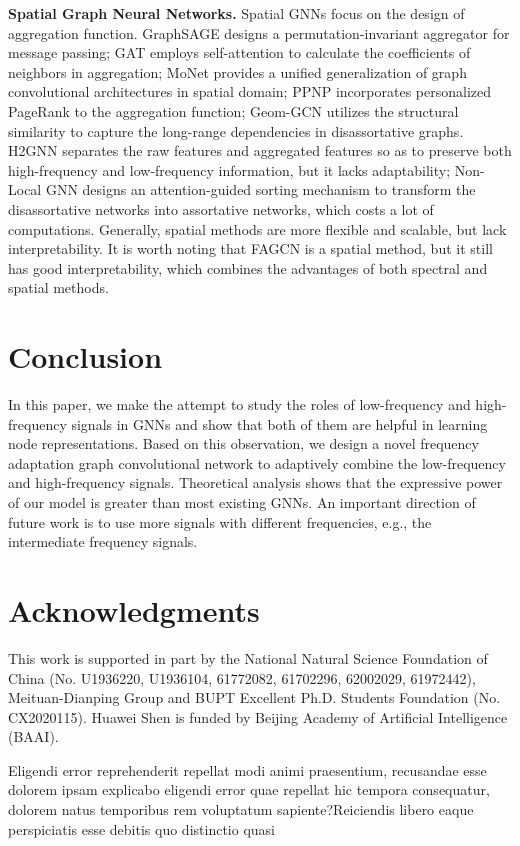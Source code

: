 \documentclass[letterpaper]{article} %
\begin{document}
\textbf{Spatial Graph Neural Networks.} Spatial GNNs focus on the design of aggregation function. GraphSAGE \cite{GraphSAGE} designs a permutation-invariant aggregator for message passing; GAT \cite{GAT} employs self-attention to calculate the coefficients of neighbors in aggregation; MoNet \cite{MoNet} provides a unified generalization of graph convolutional architectures in spatial domain; PPNP \cite{PPNP} incorporates personalized PageRank to the aggregation function;
Geom-GCN \cite{GeomGCN} utilizes the structural similarity to capture the long-range dependencies in disassortative graphs.
H2GNN \cite{H2GNN} separates the raw features and aggregated features so as to preserve both high-frequency and low-frequency information, but it lacks adaptability;
Non-Local GNN \cite{Non-Local} designs an attention-guided sorting mechanism to transform the disassortative networks into assortative networks, which costs a lot of computations.
Generally, spatial methods are more flexible and scalable, but lack interpretability.
It is worth noting that FAGCN is a spatial method, but it still has good interpretability, which combines the advantages of both spectral and spatial methods.

\section{Conclusion}

In this paper, we make the attempt to study the roles of low-frequency and high-frequency signals in GNNs and show that both of them are helpful in learning node representations. Based on this observation, we design a novel frequency adaptation graph convolutional network to adaptively combine the low-frequency and high-frequency signals. Theoretical analysis shows that the expressive power of our model is greater than most existing GNNs.
An important direction of future work is to use more signals with different frequencies, e.g., the intermediate frequency signals.

\section{Acknowledgments}
This work is supported in part by the National Natural Science Foundation of China (No. U1936220, U1936104, 61772082, 61702296, 62002029, 61972442), Meituan-Dianping Group and BUPT Excellent Ph.D. Students Foundation (No. CX2020115). Huawei Shen is funded by Beijing Academy of Artificial Intelligence (BAAI).


% 
Eligendi error reprehenderit repellat modi animi praesentium, recusandae esse dolorem ipsam explicabo eligendi error quae repellat hic tempora consequatur, dolorem natus temporibus rem voluptatum sapiente?Reiciendis libero eaque perspiciatis esse debitis quo distinctio quasi

\end{document}
